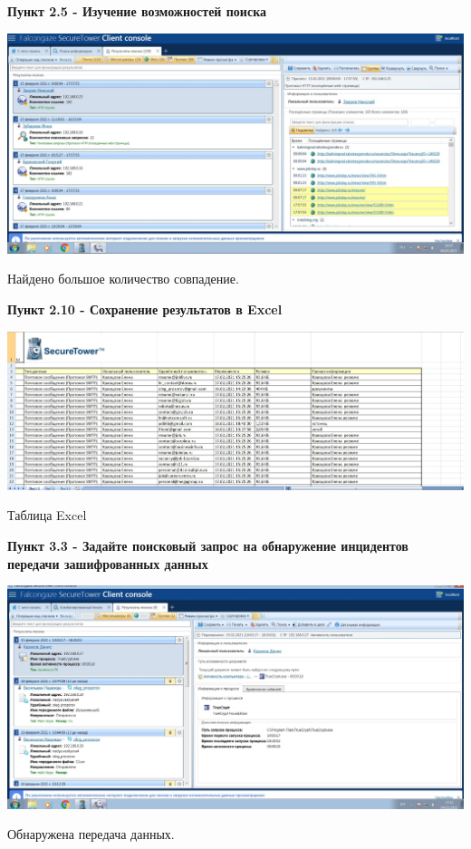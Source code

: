 \documentclass[a4paper,14pt]{extarticle}
\begin{document}
    \textbf{Пункт 2.5 - Изучение возможностей поиска}
    \begin{center}
        \includegraphics[scale=0.25]{pics/2.5.jpg}

        Найдено большое количество совпадение.
    \end{center}

    \newpage
    \textbf{Пункт 2.10 - Сохранение результатов в Excel}
    \begin{center}
        \includegraphics[scale=0.25]{pics/2.10.jpg}

        Таблица Excel
    \end{center}

    \textbf{Пункт 3.3 - Задайте поисковый запрос на обнаружение инцидентов передачи
    зашифрованных данных}
    \begin{center}
        \includegraphics[scale=0.25]{pics/3.3.jpg}

        Обнаружена передача данных. 
    \end{center}
\end{document}

